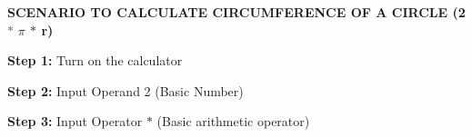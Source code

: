 \documentclass[12pt]{article}
\begin{document}
\vspace{\baselineskip}

\vspace{\baselineskip}

\vspace{\baselineskip}

\vspace{\baselineskip}

\vspace{\baselineskip}

\vspace{\baselineskip}

\vspace{\baselineskip}

\vspace{\baselineskip}

\vspace{\baselineskip}

\vspace{\baselineskip}

\vspace{\baselineskip}

\vspace{\baselineskip}

\vspace{\baselineskip}

\vspace{\baselineskip}

\vspace{\baselineskip}
\begin{justify}
\textbf{SCENARIO TO CALCULATE CIRCUMFERENCE OF A CIRCLE (2}\textcolor[HTML]{545454}{$\ast$ }\textbf{$ \pi $ $\ast$ r)}
\end{justify}\par

\setlength{\parskip}{2.04pt}
\begin{justify}
\textbf{Step 1: }Turn on the calculator
\end{justify}\par

\begin{justify}
\textbf{Step 2: }Input Operand 2 (Basic Number)
\end{justify}\par

\begin{justify}
\textbf{Step 3: }Input Operator $\ast$  (Basic arithmetic operator)
\end{justify}\par
\end{document}
